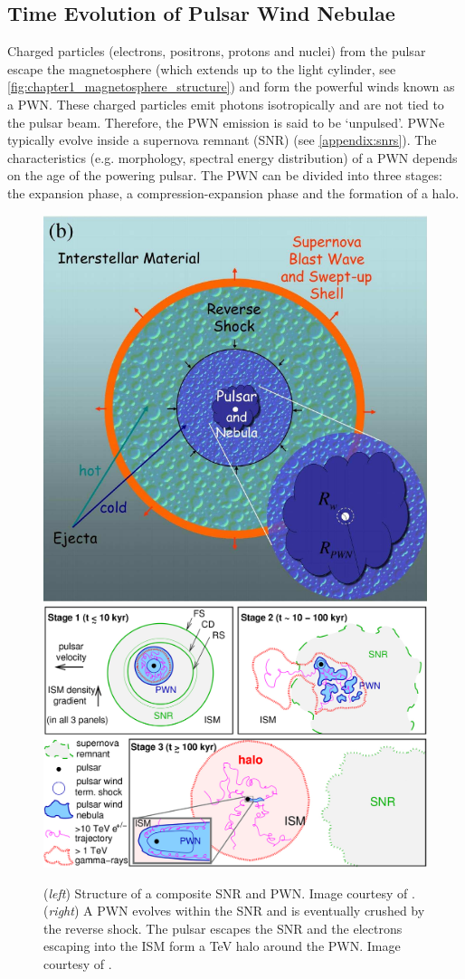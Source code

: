\subsection{Time Evolution of Pulsar Wind Nebulae} \label{sec:01_intro_time_ev_PWN}
Charged particles (electrons, positrons, protons and nuclei) from the pulsar escape the magnetosphere (which extends up to the light cylinder, see \autoref{fig:chapter1_magnetosphere_structure}) and form the powerful winds known as a PWN. These charged particles
emit photons isotropically and are not tied to the pulsar beam. Therefore, the PWN emission is said to be `unpulsed'. PWNe typically evolve inside a supernova remnant (SNR) (see \autoref{appendix:snrs}).
\newpar
The characteristics (e.g. morphology, spectral energy distribution) of a PWN depends on the age of the powering pulsar. The PWN can be divided into three stages: the expansion phase, a compression-expansion phase and the formation of a halo.

\begin{figure}[h!]
	\centering
	\includegraphics[height=0.4\textwidth]{04_Introduction/Images/pulsar_wind_nebula/pulsar_wind_nebula_structure.pdf}
	\includegraphics[height=0.4\textwidth]{04_Introduction/Images/pulsar_wind_nebula/pwn_evolution.jpg}
	\caption{(\textit{left}) Structure of a composite SNR and PWN. Image courtesy of \cite{2006ARA&A..44...17G}. (\textit{right}) A PWN evolves within the SNR and is eventually crushed by the reverse shock. The pulsar escapes the SNR and the electrons escaping into the ISM form a TeV halo around the PWN. Image courtesy of \cite{2020A&A...636A.113G}.}
	\label{fig:chapter1_pulsar_wind_nebula_structure}
\end{figure}

